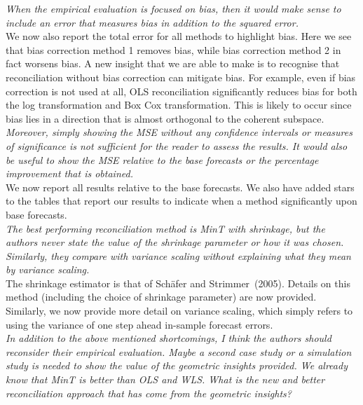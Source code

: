 \documentclass[a4paper,11pt]{article}
\begin{document}
\begin{enumerate}
		\textit{When the empirical evaluation is focused on bias, then it would make sense to include an error that measures bias in addition to the squared error.}\\
		
		We now also report the total error for all methods to highlight bias.  Here we see that bias correction method 1 removes bias, while bias correction method 2 in fact worsens bias.  A new insight that we are able to make is to recognise that reconciliation without bias correction can mitigate bias.  For example, even if bias correction is not used at all, OLS reconciliation significantly reduces bias for both the log transformation and Box Cox transformation.  This is likely to occur since bias lies in a direction that is almost orthogonal to the coherent subspace.\\
		
		\textit{Moreover, simply showing the MSE without any confidence intervals or measures of significance is not sufficient for the reader to assess the results.  It would also be useful to show the MSE relative to the base forecasts or the percentage improvement that is obtained.} \\
		
		We now report all results relative to the base forecasts. We also have added stars to the tables that report our results to indicate when a method significantly upon base forecasts.\\
	
	    \textit{The best performing reconciliation method is MinT with shrinkage, but the authors never state	the value of the shrinkage parameter or how it was chosen.  Similarly, they compare with variance scaling without explaining what they mean by variance scaling.}\\
	    
	    The shrinkage estimator is that of Sch\"afer and Strimmer~(2005). Details on this method (including the choice of shrinkage parameter) are now provided.  Similarly, we now provide more detail on variance scaling, which simply refers to using the variance of one step ahead in-sample forecast errors.\\
	    
	    \textit{In addition to the above mentioned shortcomings, I think the authors should reconsider their empirical evaluation. Maybe a second case study or a simulation study is needed to show the value of the geometric insights provided. We already know that MinT is better than OLS and WLS. What is the new and better reconciliation approach that has come from the geometric insights?}\\	
		

\end{enumerate}
\end{document}
